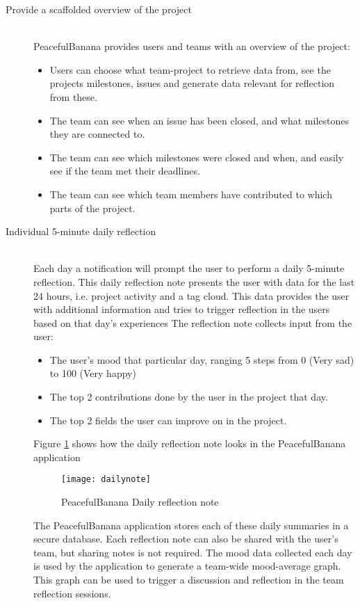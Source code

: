 \begin{description}
	\item[Provide a scaffolded overview of the project] \hfill \\
	PeacefulBanana provides users and teams with an overview of the project:
	\begin{itemize}
		\item Users can choose what team-project to retrieve data from, see the projects milestones, issues and generate data relevant for reflection from these.
		\item The team can see when an issue has been closed, and what milestones they are connected to.
		\item The team can see which milestones were closed and when, and easily see if the team met their deadlines. 
		\item The team can see which team members have contributed to which parts of the project.
	\end{itemize}

	\item[Individual 5-minute daily reflection] \hfill \\
	Each day a notification will prompt the user to perform a daily 5-minute reflection. This daily reflection note presents the user with data for the last 24 hours, i.e. project activity and a tag cloud. This data provides the user with additional information and tries to trigger reflection in the users based on that day's experiences The reflection note collects input from the user:
	\begin{itemize}
		\item The user's mood that particular day, ranging 5 steps from 0 (Very sad) to 100 (Very happy)
		\item The top 2 contributions done by the user in the project that day.
		\item The top 2 fields the user can improve on in the project.
	\end{itemize}
	Figure \ref{dailynote2} shows how the daily reflection note looks in the PeacefulBanana application
		\begin{figure}[!htpb]
		\centering
		\texttt{[image: dailynote]}
		\caption{PeacefulBanana Daily reflection note}
		\label{dailynote2}
	\end{figure}
	The PeacefulBanana application stores each of these daily summaries in a secure database. Each reflection note can also be shared with the user's team, but sharing notes is not required. The mood data collected each day is used by the application to generate a team-wide mood-average graph. This graph can be used to trigger a discussion and reflection in the team reflection sessions. 


\end{description}
